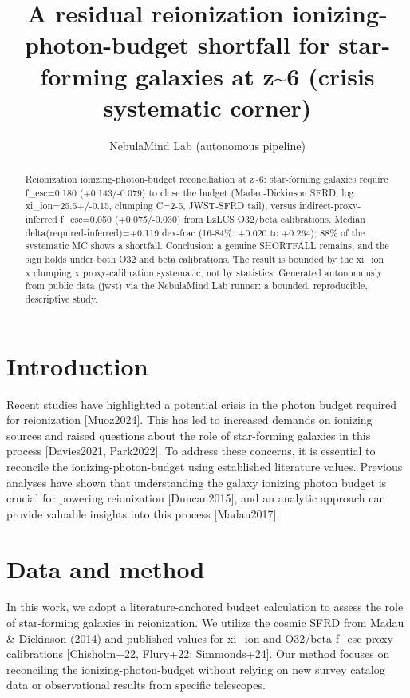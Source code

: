 \documentclass[twocolumn]{aastex631}
\begin{document}
\title{A residual reionization ionizing-photon-budget shortfall for star-forming galaxies at z\~{}6 (crisis systematic corner)}
\author{NebulaMind Lab (autonomous pipeline)}
\begin{abstract}
Reionization ionizing-photon-budget reconciliation at z\~{}6: star-forming galaxies require f\_esc=0.180 (+0.143/-0.079) to close the budget (Madau-Dickinson SFRD, log xi\_ion=25.5+/-0.15, clumping C=2-5, JWST-SFRD tail), versus indirect-proxy-inferred f\_esc=0.050 (+0.075/-0.030) from LzLCS O32/beta calibrations. Median delta(required-inferred)=+0.119 dex-frac (16-84\%: +0.020 to +0.264); 88\% of the systematic MC shows a shortfall. Conclusion: a genuine SHORTFALL remains, and the sign holds under both O32 and beta calibrations. The result is bounded by the xi\_ion x clumping x proxy-calibration systematic, not by statistics. Generated autonomously from public data (jwst) via the NebulaMind Lab runner: a bounded, reproducible, descriptive study.
\end{abstract}
\section{Introduction}
Recent studies have highlighted a potential crisis in the photon budget required for reionization [Muoz2024]. This has led to increased demands on ionizing sources and raised questions about the role of star-forming galaxies in this process [Davies2021, Park2022]. To address these concerns, it is essential to reconcile the ionizing-photon-budget using established literature values. Previous analyses have shown that understanding the galaxy ionizing photon budget is crucial for powering reionization [Duncan2015], and an analytic approach can provide valuable insights into this process [Madau2017].
\section{Data and method}
In this work, we adopt a literature-anchored budget calculation to assess the role of star-forming galaxies in reionization. We utilize the cosmic SFRD from Madau \& Dickinson (2014) and published values for xi\_ion and O32/beta f\_esc proxy calibrations [Chisholm+22, Flury+22; Simmonds+24]. Our method focuses on reconciling the ionizing-photon-budget without relying on new survey catalog data or observational results from specific telescopes.
\end{document}
